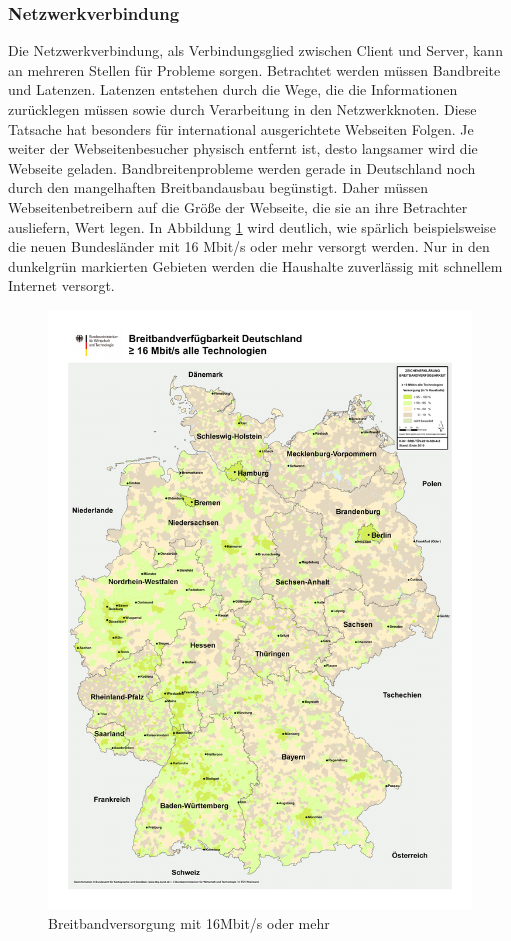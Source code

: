 \subsubsection{Netzwerkverbindung}
Die Netzwerkverbindung, als Verbindungsglied zwischen Client und Server, kann an mehreren Stellen f\"ur Probleme sorgen. Betrachtet werden m\"ussen Bandbreite und Latenzen. Latenzen entstehen durch die Wege, die die Informationen zur\"ucklegen m\"ussen sowie durch Verarbeitung in den Netzwerkknoten. Diese Tatsache hat besonders f\"ur international ausgerichtete Webseiten Folgen. Je weiter der Webseitenbesucher physisch entfernt ist, desto langsamer wird die Webseite geladen. Bandbreitenprobleme werden gerade in Deutschland noch durch den mangelhaften Breitbandausbau beg\"unstigt. Daher m\"ussen Webseitenbetreibern auf die Größe der Webseite, die sie an ihre Betrachter ausliefern, Wert legen. In Abbildung \ref{fig:breitband} wird deutlich, wie sp\"arlich beispielsweise die neuen Bundesl\"ander mit 16 Mbit/s oder mehr versorgt werden.\citep{BMWi2011} Nur in den dunkelgrün markierten Gebieten werden die Haushalte zuverlässig mit schnellem Internet versorgt.
\begin{figure}[!ht]
  \centering
  \includegraphics[scale=0.5]{material/breitband201116mbit.pdf}
  \caption{Breitbandversorgung mit 16Mbit/s oder mehr}
  \label{fig:breitband}
\end{figure}
